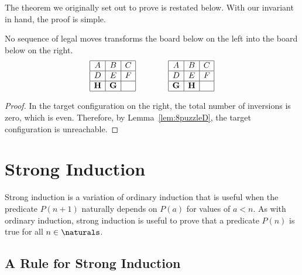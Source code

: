 The theorem we originally set out to prove is restated below.  With our
invariant in hand, the proof is simple.
\begin{theorem*}
No sequence of legal moves transforms the board below on the left into
the board below on the right.
\begin{equation*}
\begin{array}{|c|c|c|}
\hline
A & B & C \\ \hline
D & E & F \\ \hline
\mathbf{H} & \mathbf{G} &   \\ \hline
\end{array}
\qquad\qquad
\begin{array}{|c|c|c|}
\hline
A & B & C \\ \hline
D & E & F \\ \hline
\mathbf{G} & \mathbf{H} &   \\ \hline
\end{array}
\end{equation*}
\end{theorem*}

\begin{proof}
In the target configuration on the right, the total number of
inversions is zero, which is even.  Therefore, by
Lemma~\ref{lem:8puzzleD}, the target configuration is unreachable.
\end{proof}

\section{Strong Induction}\label{sec:strong-induction}

Strong induction is a variation of ordinary induction that is useful
when the predicate $P(n+1)$ naturally depends on $P(a)$ for values of
$a < n$.  As with ordinary induction, strong induction is useful to
prove that a predicate $P(n)$ is true for all $n \in \naturals$.

\subsection{A Rule for Strong Induction}


